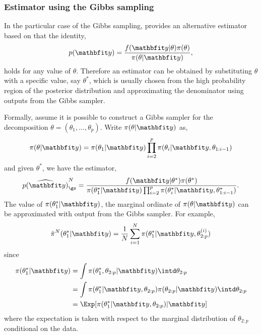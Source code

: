 \subsubsection{Estimator using the Gibbs sampling}
\label{ssub:Estimator using the Gibbs sampling}

In the particular case of the Gibbs sampling, \cite{Chib:1995em} provides an
alternative estimator based on that the identity,
\begin{equation}
  p(\data) = \frac{f(\data|\theta)\pi(\theta)}{\pi(\theta|\data)},
\end{equation}
holds for any value of $\theta$. Therefore an estimator can be obtained by
substituting $\theta$ with a specific value, say $\theta^*$, which is usually
chosen from the high probability region of the posterior distribution and
approximating the denominator using outputs from the Gibbs sampler.

Formally, assume it is possible to construct a Gibbs sampler for the
decomposition $\theta = (\theta_1,\dots,\theta_p)$. Write $\pi(\theta|\data)$
as,
\begin{equation}
  \pi(\theta|\data) = \pi(\theta_1|\data)
  \prod_{i=2}^p\pi(\theta_i|\data,\theta_{1:i-1})
\end{equation}
and given $\theta^*$, we have the estimator,
\begin{equation}
  \widehat{p(\data)}_{\gs}^N = \frac{f(\data|\theta^*)\pi(\theta^*)}
  {\pi(\theta_1^*|\data)
    \prod_{i=2}^p\pi(\theta_i^*|\data,\theta_{1:i-1}^*)}.
\end{equation}
The value of $\pi(\theta_1^*|\data)$, the marginal ordinate of
$\pi(\theta|\data)$ can be approximated with output from the Gibbs sampler.
For example,
\begin{equation}
  \hat\pi^N(\theta_1^*|\data)
  = \frac{1}{N}\sum_{i=1}^N \pi(\theta_1^*|\data,\theta_{2:p}^{(i)})
  \label{eq:est gibbs first}
\end{equation}
since
\begin{align*}
  \pi(\theta_1^*|\data)
  &= \int\pi(\theta_1^*, \theta_{2:p}|\data)\intd\theta_{2:p} \\
  &= \int\pi(\theta_1^*|\data,\theta_{2:p})
  \pi(\theta_{2:p}|\data)\intd\theta_{2:p} \\
  &= \Exp[\pi(\theta_1^*|\data,\theta_{2:p})|\data]
\end{align*}
where the expectation is taken with respect to the marginal distribution of
$\theta_{2:p}$ conditional on the data.

